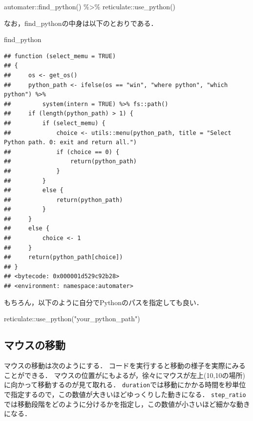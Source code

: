 \documentclass[
]{article}
\newenvironment{Shaded}{\begin{snugshade}}{\end{snugshade}}
\newcommand{\FunctionTok}[1]{\textcolor[rgb]{0.00,0.00,0.00}{#1}}
\newcommand{\NormalTok}[1]{#1}
\newcommand{\SpecialCharTok}[1]{\textcolor[rgb]{0.00,0.00,0.00}{#1}}
\newcommand{\StringTok}[1]{\textcolor[rgb]{0.31,0.60,0.02}{#1}}
\begin{document}
\begin{Shaded}
\begin{Highlighting}[]
\NormalTok{automater}\SpecialCharTok{::}\FunctionTok{find\_python}\NormalTok{() }\SpecialCharTok{\%\textgreater{}\%}
\NormalTok{  reticulate}\SpecialCharTok{::}\FunctionTok{use\_python}\NormalTok{()}
\end{Highlighting}
\end{Shaded}

なお，find\_pythonの中身は以下のとおりである．

\begin{Shaded}
\begin{Highlighting}[]
\NormalTok{find\_python}
\end{Highlighting}
\end{Shaded}

\begin{verbatim}
## function (select_memu = TRUE) 
## {
##     os <- get_os()
##     python_path <- ifelse(os == "win", "where python", "which python") %>% 
##         system(intern = TRUE) %>% fs::path()
##     if (length(python_path) > 1) {
##         if (select_memu) {
##             choice <- utils::menu(python_path, title = "Select Python path. 0: exit and return all.")
##             if (choice == 0) {
##                 return(python_path)
##             }
##         }
##         else {
##             return(python_path)
##         }
##     }
##     else {
##         choice <- 1
##     }
##     return(python_path[choice])
## }
## <bytecode: 0x000001d529c92b28>
## <environment: namespace:automater>
\end{verbatim}

もちろん，以下のように自分でPythonのパスを指定しても良い．

\begin{Shaded}
\begin{Highlighting}[]
\NormalTok{reticulate}\SpecialCharTok{::}\FunctionTok{use\_python}\NormalTok{(}\StringTok{"your\_python\_path"}\NormalTok{)}
\end{Highlighting}
\end{Shaded}

\hypertarget{ux30deux30a6ux30b9ux306eux79fbux52d5}{%
\subsection{マウスの移動}\label{ux30deux30a6ux30b9ux306eux79fbux52d5}}

マウスの移動は次のようにする．
コードを実行すると移動の様子を実際にみることができる．
マウスの位置がにもよるが，徐々にマウスが左上(10,10の場所)に向かって移動するのが見て取れる．
\texttt{duration}では移動にかかる時間を秒単位で指定するので，この数値が大きいほどゆっくりした動きになる．
\texttt{step\_ratio}では移動段階をどのように分けるかを指定し，この数値が小さいほど細かな動きになる．
\end{document}
